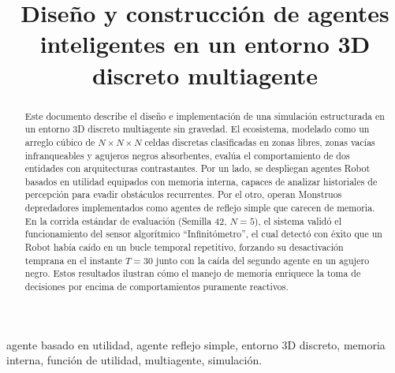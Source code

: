 \documentclass[conference]{IEEEtran}
\begin{document}

\title{Diseño y construcción de agentes inteligentes en un entorno 3D discreto multiagente}

\author{
}

\maketitle


\begin{abstract}
Este documento describe el diseño e implementación de una simulación estructurada en un entorno 3D discreto multiagente sin gravedad. El ecosistema, modelado como un arreglo cúbico de $N \times N \times N$ celdas discretas clasificadas en zonas libres, zonas vacías infranqueables y agujeros negros absorbentes, evalúa el comportamiento de dos entidades con arquitecturas contrastantes. Por un lado, se despliegan agentes Robot basados en utilidad equipados con memoria interna, capaces de analizar historiales de percepción para evadir obstáculos recurrentes. Por el otro, operan Monstruos depredadores implementados como agentes de reflejo simple que carecen de memoria. En la corrida estándar de evaluación (Semilla 42, $N=5$), el sistema validó el funcionamiento del sensor algorítmico ``Infinitómetro'', el cual detectó con éxito que un Robot había caído en un bucle temporal repetitivo, forzando su desactivación temprana en el instante $T=30$ junto con la caída del segundo agente en un agujero negro. Estos resultados ilustran cómo el manejo de memoria enriquece la toma de decisiones por encima de comportamientos puramente reactivos.
\end{abstract}

\begin{IEEEkeywords}
agente basado en utilidad, agente reflejo simple, entorno 3D discreto, memoria interna, función de utilidad, multiagente, simulación.
\end{IEEEkeywords}
\end{document}
